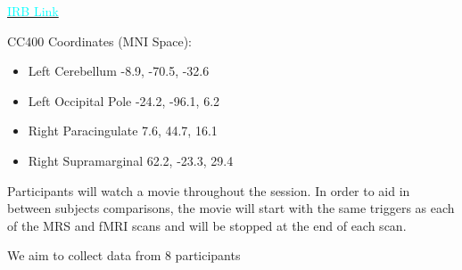 


\href{https://bit.ly/2HIPzOw}{\textcolor{cyan}{IRB Link}}

\divider

CC400 Coordinates (MNI Space):
    \begin{itemize}
        \item Left Cerebellum \hfill -8.9, -70.5, -32.6
        \item Left Occipital Pole \hfill -24.2, -96.1, 6.2
        \item Right Paracingulate \hfill 7.6, 44.7, 16.1
        \item Right Supramarginal \hfill 62.2, -23.3, 29.4
    \end{itemize}
    
\divider

Participants will watch a movie throughout the session. In order to aid in between subjects comparisons, the movie will start with the same triggers as each of the MRS and fMRI scans and will be stopped at the end of each scan.

 \divider
 
 We aim to collect data from 8 participants
 
 \divider




